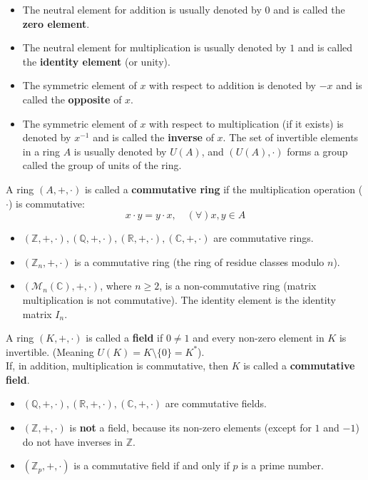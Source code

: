 \begin{remark}
\begin{itemize}
    \item The neutral element for addition is usually denoted by $0$ and is called the \textbf{zero element}.
    \item The neutral element for multiplication is usually denoted by $1$ and is called the \textbf{identity element} (or unity).
    \item The symmetric element of $x$ with respect to addition is denoted by $-x$ and is called the \textbf{opposite} of $x$.
    \item The symmetric element of $x$ with respect to multiplication (if it exists) is denoted by $x^{-1}$ and is called the \textbf{inverse} of $x$. The set of invertible elements in a ring $A$ is usually denoted by $U(A)$, and $(U(A), \cdot)$ forms a group called the group of units of the ring.
\end{itemize}
\end{remark}

\begin{definition}
A ring $(A, +, \cdot)$ is called a \textbf{commutative ring} if the multiplication operation ($\cdot$) is commutative:
$$ x \cdot y = y \cdot x, \quad (\forall) x, y \in A $$
\end{definition}

\begin{example}\leavevmode
\begin{itemize}
    \item $(\mathbb{Z}, +, \cdot), (\mathbb{Q}, +, \cdot), (\mathbb{R}, +, \cdot), (\mathbb{C}, +, \cdot)$ are commutative rings.
    \item $(\mathbb{Z}_n, +, \cdot)$ is a commutative ring (the ring of residue classes modulo $n$).
    \item $(\mathcal{M}_n(\mathbb{C}), +, \cdot)$, where $n \ge 2$, is a non-commutative ring (matrix multiplication is not commutative). The identity element is the identity matrix $I_n$.
\end{itemize}
\end{example}

\begin{definition}
A ring $(K, +, \cdot)$ is called a \textbf{field} if $0 \neq 1$ and every non-zero element in $K$ is invertible. (Meaning $U(K) = K \setminus \{0\} = K^*$). \\
If, in addition, multiplication is commutative, then $K$ is called a \textbf{commutative field}.
\end{definition}

\begin{example}\leavevmode
\begin{itemize}
    \item $(\mathbb{Q}, +, \cdot), (\mathbb{R}, +, \cdot), (\mathbb{C}, +, \cdot)$ are commutative fields.
    \item $(\mathbb{Z}, +, \cdot)$ is \textbf{not} a field, because its non-zero elements (except for $1$ and $-1$) do not have inverses in $\mathbb{Z}$.
    \item $(\mathbb{Z}_p, +, \cdot)$ is a commutative field if and only if $p$ is a prime number.
\end{itemize}
\end{example}